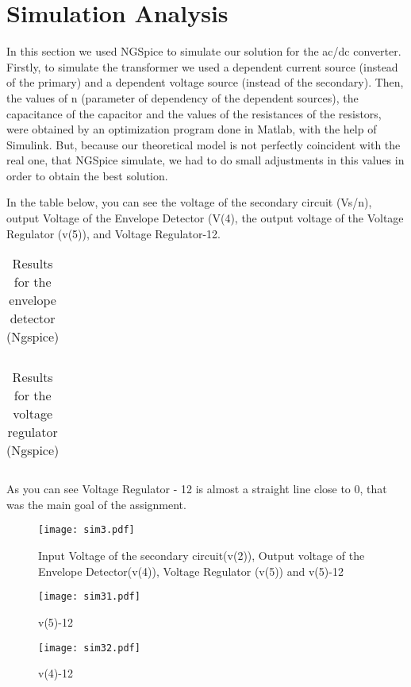 \section{Simulation Analysis}
\label{simulanal}
In this section we used NGSpice to simulate our solution for the ac/dc converter. Firstly, to simulate the transformer we used a dependent current source (instead of the primary) and a dependent voltage source (instead of the secondary).
Then, the values of n (parameter of dependency of the dependent sources), the capacitance of the capacitor and the values of the resistances of the resistors, were obtained by an optimization program done in Matlab, with the help of Simulink. But, because our theoretical model is not perfectly coincident with the real one, that NGSpice simulate, we had to do small adjustments in this values in order to obtain the best solution.
\par In the table below, you can see the  voltage of the secondary circuit (Vs/n), output Voltage of the Envelope Detector (V(4), the output voltage of the Voltage Regulator (v(5)), and Voltage Regulator-12.
\par \begin{table}[h]
\centering
\begin{tabularx}{0.6\textwidth} {
  | >{\raggedright\arraybackslash}X
  | >{\raggedleft\arraybackslash}X | }
 \hline

\end{tabularx}
\caption{Results for the envelope detector (Ngspice)}
\end{table}

\begin{table}[h]
\centering
\begin{tabularx}{0.6\textwidth} {
  | >{\raggedright\arraybackslash}X
  | >{\raggedleft\arraybackslash}X | }
 \hline

\end{tabularx}
\caption{Results for the voltage regulator (Ngspice)}
\end{table}

\par As you can see Voltage Regulator - 12 is almost a straight line close to 0, that was the main goal of the assignment.
\begin{figure}[H] \centering
\texttt{[image: sim3.pdf]}
\caption{Input Voltage of the secondary circuit(v(2)), Output voltage of the Envelope Detector(v(4)), Voltage Regulator (v(5)) and v(5)-12}
\label{fig:snat1}
\end{figure}
\begin{figure}[H] \centering
\texttt{[image: sim31.pdf]}
\caption{v(5)-12}
\label{fig:snat2}
\end{figure}
\begin{figure}[H] \centering
\texttt{[image: sim32.pdf]}
\caption{v(4)-12}
\label{fig:snat3}
\end{figure}

